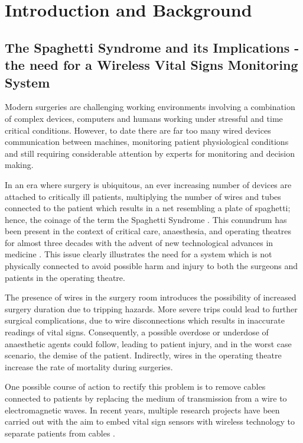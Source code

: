 \chapter{Introduction and Background}

\section{The Spaghetti Syndrome and its Implications - the need for a Wireless Vital Signs Monitoring System}

Modern surgeries are challenging working environments involving a combination of complex devices, computers and humans working under stressful and time critical conditions. However, to date there are far too many wired devices communication between machines, monitoring patient physiological conditions and still requiring considerable attention by experts for monitoring and decision making.

In an era where surgery is ubiquitous, an ever increasing number of devices are attached to critically ill patients, multiplying the number of wires and tubes connected to the patient which results in a net resembling a plate of spaghetti; hence, the coinage of the term the Spaghetti Syndrome \cite{imhoff2004spaghetti}. This conundrum has been present in the context of critical care, anaesthesia, and operating theatres for almost three decades with the advent of new technological advances in medicine \cite{cesarano1979spaghetti}. This issue clearly illustrates the need for a system which is not physically connected to avoid possible harm and injury to both the surgeons and patients in the operating theatre. 

The presence of wires in the surgery room introduces the possibility of increased surgery duration due to tripping hazards. More severe trips could lead to further surgical complications, due to wire disconnections which results in inaccurate readings of vital signs. Consequently, a possible overdose or underdose of anaesthetic agents could follow, leading to patient injury, and in the worst case scenario, the demise of the patient. Indirectly, wires in the operating theatre increase the rate of mortality during surgeries. 

One possible course of action to rectify this problem is to remove cables connected to patients by replacing the medium of transmission from a wire to electromagnetic waves. In recent years, multiple research projects have been carried out with the aim to embed vital sign sensors with wireless technology to separate patients from cables \cite{rosenthal2003new}.  

